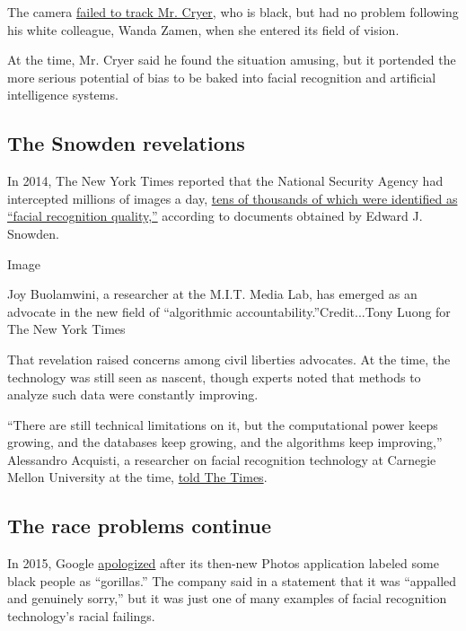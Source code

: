 The camera \href{http://www.cnn.com/2009/TECH/12/22/hp.webcams/}{failed
to track Mr. Cryer}, who is black, but had no problem following his
white colleague, Wanda Zamen, when she entered its field of vision.

At the time, Mr. Cryer said he found the situation amusing, but it
portended the more serious potential of bias to be baked into facial
recognition and artificial intelligence systems.

\hypertarget{the-snowden-revelations}{%
\subsection{The Snowden revelations}\label{the-snowden-revelations}}

In 2014, The New York Times reported that the National Security Agency
had intercepted millions of images a day,
\href{https://www.nytimes3xbfgragh.onion/2014/06/01/us/nsa-collecting-millions-of-faces-from-web-images.html}{tens
of thousands of which were identified as ``facial recognition
quality,''} according to documents obtained by Edward J. Snowden.

Image

Joy Buolamwini, a researcher at the M.I.T. Media Lab, has emerged as an
advocate in the new field of ``algorithmic
accountability.''Credit...Tony Luong for The New York Times

That revelation raised concerns among civil liberties advocates. At the
time, the technology was still seen as nascent, though experts noted
that methods to analyze such data were constantly improving.

``There are still technical limitations on it, but the computational
power keeps growing, and the databases keep growing, and the algorithms
keep improving,'' Alessandro Acquisti, a researcher on facial
recognition technology at Carnegie Mellon University at the time,
\href{https://www.nytimes3xbfgragh.onion/2014/06/01/us/nsa-collecting-millions-of-faces-from-web-images.html}{told
The Times}.

\hypertarget{the-race-problems-continue}{%
\subsection{The race problems
continue}\label{the-race-problems-continue}}

In 2015, Google
\href{https://www.usatoday.com/story/tech/2015/07/01/google-apologizes-after-photos-identify-black-people-as-gorillas/29567465/}{apologized}
after its then-new Photos application labeled some black people as
``gorillas.'' The company said in a statement that it was ``appalled and
genuinely sorry,'' but it was just one of many examples of facial
recognition technology's racial failings.

